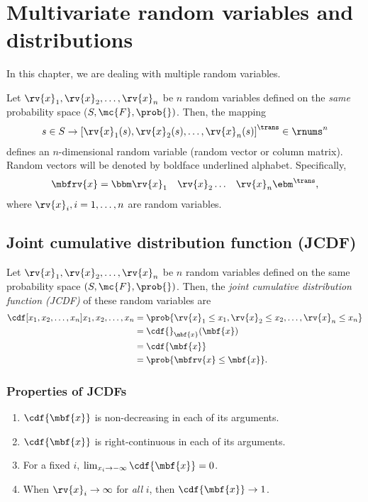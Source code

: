 \section{Multivariate random variables and distributions}
In this chapter, we are dealing with multiple random variables. 

\begin{definitionBox}
  \label{def:multiple random variable}
  Let $\rv{x}_{1}, \rv{x}_{2},\ldots,\rv{x}_n$ be $n$ random variables defined on the \emph{same} probability space ($S, \mc{F}, \prob{})$. Then, the mapping
  \begin{align}
      s\in S\to \left[ \rv{x}_{1}(s), \rv{x}_{2}(s),\ldots,\rv{x}_n(s) \right]^{\trans}\in\rnums^n
  \end{align}
  defines an $n$-dimensional random variable (random vector or column matrix). Random vectors will be denoted by boldface underlined alphabet. Specifically,
  \begin{align}
      \mbfrv{x} &= 
      \bbm \rv{x}_{1} & \rv{x}_{2} & \ldots &\rv{x}_n \ebm^{\trans},
  \end{align}
  where $\rv{x}_{i}, i=1,\ldots, n$ are random variables. 
\end{definitionBox}

\subsection{Joint cumulative distribution function (JCDF)}
\begin{definitionBox}
    Let $\rv{x}_{1}, \rv{x}_{2}, \ldots, \rv{x}_n$ be $n$ random variables defined on the same probability space $(S,\mc{F},\prob{})$. Then, the \emph{joint cumulative distribution function (JCDF)} of these random variables are 
    \begin{align}
        \cdf[x_{1},x_{2},\ldots,x_n]{x_{1},x_{2},\ldots,x_n} 
        &= \prob{\rv{x}_{1}\leq x_{1}, \rv{x}_{2}\leq x_{2}, \ldots, \rv{x}_n\leq x_n}\\
        &= \cdf{}_{\mbf{x}}(\mbf{x})\\
        &= \cdf{\mbf{x}}\\
        &= \prob{\mbfrv{x}\leq\mbf{x}}.
    \end{align}
\end{definitionBox}
\subsubsection*{Properties of JCDFs}
\begin{enumerate}
    \item $\cdf{\mbf{x}}$ is non-decreasing in each of its arguments.
    \item $\cdf{\mbf{x}}$ is right-continuous in each of its arguments.
    \item For a fixed $i$, $\lim_{x_{i}\to-\infty} \cdf{\mbf{x}}=0$.
    \item When $\rv{x}_{i}\to\infty$ for \emph{all} $i$, then $\cdf{\mbf{x}}\to 1$.
\end{enumerate}

